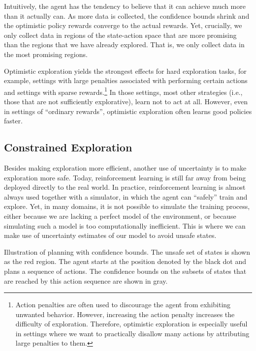 Intuitively, the agent has the tendency to believe that it can achieve much more than it actually can.
As more data is collected, the confidence bounds shrink and the optimistic policy rewards converge to the actual rewards.
Yet, crucially, we only collect data in regions of the state-action space that are more promising than the regions that we have already explored.
That is, we only collect data in the most promising regions.

Optimistic exploration yields the strongest effects for hard exploration tasks, for example, settings with large penalties associated with performing certain actions and settings with sparse rewards.\footnote{Action penalties are often used to discourage the agent from exhibiting unwanted behavior.
However, increasing the action penalty increases the difficulty of exploration.
Therefore, optimistic exploration is especially useful in settings where we want to practically disallow many actions by attributing large penalties to them.}
In those settings, most other strategies (i.e., those that are not sufficiently explorative), learn not to act at all.
However, even in settings of ``ordinary rewards'', optimistic exploration often learns good policies faster.

\subsection{Constrained Exploration}\label{sec:mbarl:exploration:constrained}

Besides making exploration more efficient, another use of uncertainty is to make exploration more safe.
Today, reinforcement learning is still far away from being deployed directly to the real world.
In practice, reinforcement learning is almost always used together with a simulator, in which the agent can ``safely'' train and explore.
Yet, in many domains, it is not possible to simulate the training process, either because we are lacking a perfect model of the environment, or because simulating such a model is too computationally inefficient.
This is where we can make use of uncertainty estimates of our model to avoid unsafe states.

\begin{marginfigure}
  \caption{Illustration of planning with confidence bounds.
  The unsafe set of states is shown as the red region.
  The agent starts at the position denoted by the black dot and plans a sequence of actions.
  The confidence bounds on the subsets of states that are reached by this action sequence are shown in gray.}
\end{marginfigure}

